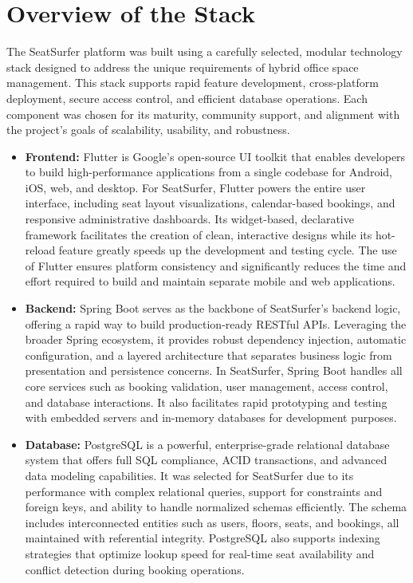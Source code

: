 \documentclass[12pt,a4paper]{report} %
\begin{document}
\section{Overview of the Stack}

The SeatSurfer platform was built using a carefully selected, modular technology stack designed to address the unique requirements of hybrid office space management. This stack supports rapid feature development, cross-platform deployment, secure access control, and efficient database operations. Each component was chosen for its maturity, community support, and alignment with the project's goals of scalability, usability, and robustness.

\begin{itemize}
    \item \textbf{Frontend:} Flutter is Google's open-source UI toolkit that enables developers to build high-performance applications from a single codebase for Android, iOS, web, and desktop. For SeatSurfer, Flutter powers the entire user interface, including seat layout visualizations, calendar-based bookings, and responsive administrative dashboards. Its widget-based, declarative framework facilitates the creation of clean, interactive designs while its hot-reload feature greatly speeds up the development and testing cycle. The use of Flutter ensures platform consistency and significantly reduces the time and effort required to build and maintain separate mobile and web applications.

    \item \textbf{Backend:} Spring Boot serves as the backbone of SeatSurfer's backend logic, offering a rapid way to build production-ready RESTful APIs. Leveraging the broader Spring ecosystem, it provides robust dependency injection, automatic configuration, and a layered architecture that separates business logic from presentation and persistence concerns. In SeatSurfer, Spring Boot handles all core services such as booking validation, user management, access control, and database interactions. It also facilitates rapid prototyping and testing with embedded servers and in-memory databases for development purposes.

    \item \textbf{Database:} PostgreSQL is a powerful, enterprise-grade relational database system that offers full SQL compliance, ACID transactions, and advanced data modeling capabilities. It was selected for SeatSurfer due to its performance with complex relational queries, support for constraints and foreign keys, and ability to handle normalized schemas efficiently. The schema includes interconnected entities such as users, floors, seats, and bookings, all maintained with referential integrity. PostgreSQL also supports indexing strategies that optimize lookup speed for real-time seat availability and conflict detection during booking operations.


\end{itemize}
\end{document}
